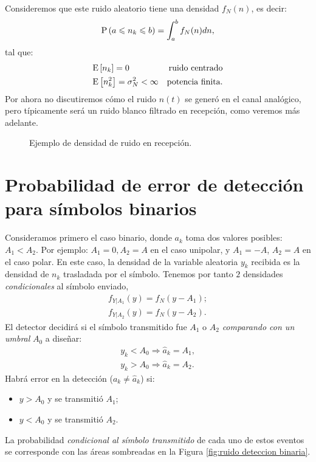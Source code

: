 Consideremos que este ruido aleatorio tiene una densidad $f_N(n)$, es decir:
\begin{equation*}
\mathrm{P}\left(a\leqslant n_k \leqslant b\right) = \int_a^b f_N(n)dn,
\end{equation*}
tal que:
\begin{align*}
    &\mathrm{E}\left[n_k\right] = 0 &\text{ruido centrado}\\
    &\mathrm{E}\left[n_k^2\right] = \sigma_N^2 < \infty &\text{potencia finita}.
\end{align*}
Por ahora no discutiremos cómo el ruido $n(t)$ se generó en el canal analógico, pero típicamente será un ruido blanco filtrado en recepción, como veremos más adelante.

\begin{figure}
    \begin{center}
    \end{center}
    \caption{Ejemplo de densidad de ruido en recepción.}\label{fig:densidad ruido}
\end{figure}

\section{Probabilidad de error de detección para símbolos binarios}

Consideramos primero el caso binario, donde $a_k$ toma dos valores posibles: $A_1 < A_2$. Por ejemplo: $A_1=0, A_2 = A$ en el caso unipolar, y $A_1=-A$, $A_2=A$ en el caso polar. En este caso, la densidad de la variable aleatoria $y_k$ recibida es la densidad de $n_k$ trasladada por el símbolo. Tenemos por tanto $2$ densidades \emph{condicionales} al símbolo enviado,
\begin{gather*}
    f_{Y|A_1} (y) = f_N(y-A_1);\\
    f_{Y|A_2} (y) = f_N(y-A_2).
\end{gather*}
El detector decidirá si el símbolo transmitido fue $A_1$ o $A_2$ \emph{comparando con un umbral} $A_0$ a diseñar:
\begin{gather*}
    y_k < A_0 \Rightarrow \hat{a}_k=A_1, \\
    y_k > A_0 \Rightarrow \hat{a}_k=A_2.
\end{gather*}
Habrá error en la detección ($a_k\neq\hat{a}_k$) si:
\begin{itemize}
    \item $y>A_0$ y se transmitió $A_1$;
    \item $y<A_0$ y se transmitió $A_2$.
\end{itemize}
La probabilidad \emph{condicional al símbolo transmitido} de cada uno de estos eventos se corresponde con las áreas sombreadas en la Figura \ref{fig:ruido deteccion binaria}.

